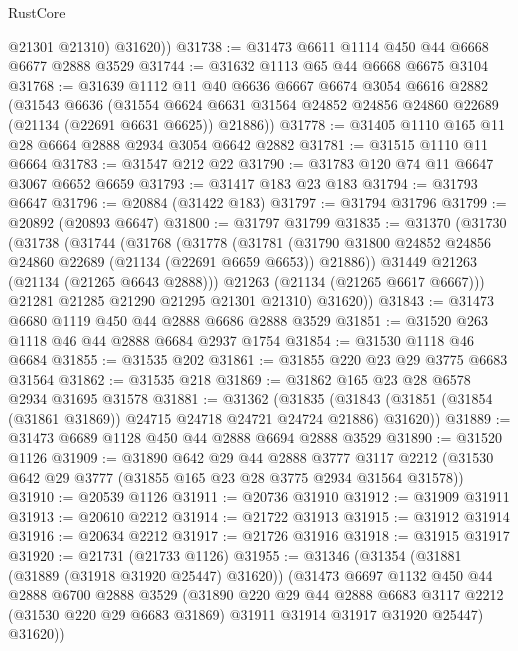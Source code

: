 \begin{lexlean}{RustCore}
\begin{coremodule}
          @21301
          @21310)
        @31620))
@31738 := @31473 @6611 @1114 @450 @44 @6668 @6677 @2888 @3529
@31744 := @31632 @1113 @65 @44 @6668 @6675 @3104
@31768 := @31639
    @1112
    @11
    @40
    @6636
    @6667
    @6674
    @3054
    @6616
    @2882
    (@31543
      @6636
      (@31554 @6624 @6631 @31564 @24852 @24856 @24860 @22689 (@21134 (@22691 @6631 @6625)) @21886))
@31778 := @31405 @1110 @165 @11 @28 @6664 @2888 @2934 @3054 @6642 @2882
@31781 := @31515 @1110 @11 @6664
@31783 := @31547 @212 @22
@31790 := @31783 @120 @74 @11 @6647 @3067 @6652 @6659
@31793 := @31417 @183 @23 @183
@31794 := @31793 @6647
@31796 := @20884 (@31422 @183)
@31797 := @31794 @31796
@31799 := @20892 (@20893 @6647)
@31800 := @31797 @31799
@31835 := @31370
    (@31730
      (@31738
        (@31744
          (@31768
            (@31778
              (@31781
                (@31790 @31800 @24852 @24856 @24860 @22689 (@21134 (@22691 @6659 @6653)) @21886))
              @31449
              @21263
              (@21134 (@21265 @6643 @2888)))
            @21263
            (@21134 (@21265 @6617 @6667)))
          @21281
          @21285
          @21290
          @21295
          @21301
          @21310)
        @31620))
@31843 := @31473 @6680 @1119 @450 @44 @2888 @6686 @2888 @3529
@31851 := @31520 @263 @1118 @46 @44 @2888 @6684 @2937 @1754
@31854 := @31530 @1118 @46 @6684
@31855 := @31535 @202
@31861 := @31855 @220 @23 @29 @3775 @6683 @31564
@31862 := @31535 @218
@31869 := @31862 @165 @23 @28 @6578 @2934 @31695 @31578
@31881 := @31362
    (@31835 (@31843 (@31851 (@31854 (@31861 @31869)) @24715 @24718 @24721 @24724 @21886) @31620))
@31889 := @31473 @6689 @1128 @450 @44 @2888 @6694 @2888 @3529
@31890 := @31520 @1126
@31909 := @31890
    @642
    @29
    @44
    @2888
    @3777
    @3117
    @2212
    (@31530 @642 @29 @3777 (@31855 @165 @23 @28 @3775 @2934 @31564 @31578))
@31910 := @20539 @1126
@31911 := @20736 @31910
@31912 := @31909 @31911
@31913 := @20610 @2212
@31914 := @21722 @31913
@31915 := @31912 @31914
@31916 := @20634 @2212
@31917 := @21726 @31916
@31918 := @31915 @31917
@31920 := @21731 (@21733 @1126)
@31955 := @31346
    (@31354
      (@31881 (@31889 (@31918 @31920 @25447) @31620))
      (@31473
        @6697
        @1132
        @450
        @44
        @2888
        @6700
        @2888
        @3529
        (@31890
          @220
          @29
          @44
          @2888
          @6683
          @3117
          @2212
          (@31530 @220 @29 @6683 @31869)
          @31911
          @31914
          @31917
          @31920
          @25447)
        @31620))

\end{coremodule}
\end{lexlean}
